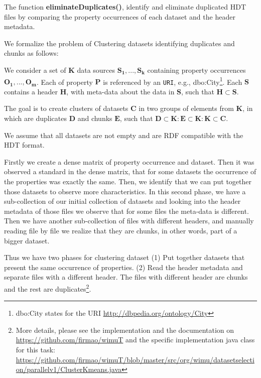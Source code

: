 The function \textbf{eliminateDuplicates()}, identify and eliminate duplicated HDT files by comparing the property occurrences of each dataset and the header metadata.

We formalize the problem of Clustering datasets identifying duplicates and chunks as follows:

We consider a set of $\mathbf{K}$ data sources $\mathbf{S_1}, . . . , \mathbf{S_k}$ containing property occurrences $\mathbf{O_1}, . . . , \mathbf{O_m}$. Each of property $\mathbf{P}$ is referenced by an \texttt{URI}, e.g., dbo:City\footnote{dbo:City states for the URI \url{http://dbpedia.org/ontology/City}}. Each $\mathbf{S}$ contains a header $\mathbf{H}$, with meta-data about the data in $\mathbf{S}$, such that $\mathbf{H} \subset \mathbf{S}$.

The goal is to create clusters of datasets $\mathbf{C}$ in two groups of elements from $\mathbf{K}$, in which are duplicates $\mathbf{D}$ and chunks $\mathbf{E}$, such that $\mathbf{D} \subset \mathbf{K} : \mathbf{E} \subset \mathbf{K} : \mathbf{K} \subset \mathbf{C}$.

We assume that all datasets are not empty and are RDF compatible with the HDT format.

Firstly we create a dense matrix of property occurrence and dataset. Then it was observed a standard in the dense matrix, that for some datasets the occurrence of the properties was exactly the same. Then, we identify that we can put together those datasets to observe more characteristics.
In this second phase, we have a sub-collection of our initial collection of datasets and looking into the header metadata of those files we observe that for some files the meta-data is different. Then we have another sub-collection of files with different headers, and manually reading file by file we realize that they are chunks, in other words, part of a bigger dataset. 

Thus we have two phases for clustering dataset (1) Put together datasets that present the same occurrence of properties. (2) Read the header metadata and separate files with a different header. The files with different header are chunks and the rest are duplicates\footnote{More details, please see the implementation and the documentation on \url{https://github.com/firmao/wimuT} and the specific implementation java class for this task: \url{https://github.com/firmao/wimuT/blob/master/src/org/wimu/datasetselection/parallelv1/ClusterKmeans.java}}.


